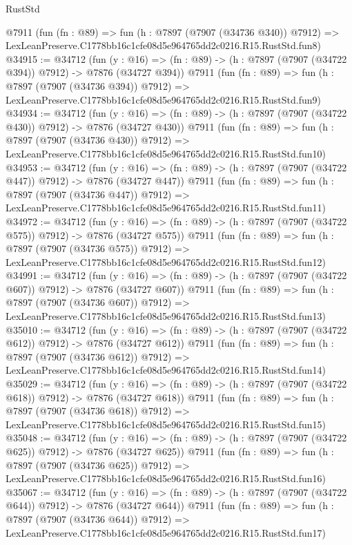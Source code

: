 \begin{lexlean}{RustStd}
\begin{coremodule}
    @7911
    (fun (fn : @89) =>
    fun (h : @7897 (@7907 (@34736 @340)) @7912) =>
    LexLeanPreserve.C1778bb16c1cfe08d5e964765dd2c0216.R15.RustStd.fun8)
@34915 := @34712
    (fun (y : @16) => (fn : @89) -> (h : @7897 (@7907 (@34722 @394)) @7912) -> @7876 (@34727 @394))
    @7911
    (fun (fn : @89) =>
    fun (h : @7897 (@7907 (@34736 @394)) @7912) =>
    LexLeanPreserve.C1778bb16c1cfe08d5e964765dd2c0216.R15.RustStd.fun9)
@34934 := @34712
    (fun (y : @16) => (fn : @89) -> (h : @7897 (@7907 (@34722 @430)) @7912) -> @7876 (@34727 @430))
    @7911
    (fun (fn : @89) =>
    fun (h : @7897 (@7907 (@34736 @430)) @7912) =>
    LexLeanPreserve.C1778bb16c1cfe08d5e964765dd2c0216.R15.RustStd.fun10)
@34953 := @34712
    (fun (y : @16) => (fn : @89) -> (h : @7897 (@7907 (@34722 @447)) @7912) -> @7876 (@34727 @447))
    @7911
    (fun (fn : @89) =>
    fun (h : @7897 (@7907 (@34736 @447)) @7912) =>
    LexLeanPreserve.C1778bb16c1cfe08d5e964765dd2c0216.R15.RustStd.fun11)
@34972 := @34712
    (fun (y : @16) => (fn : @89) -> (h : @7897 (@7907 (@34722 @575)) @7912) -> @7876 (@34727 @575))
    @7911
    (fun (fn : @89) =>
    fun (h : @7897 (@7907 (@34736 @575)) @7912) =>
    LexLeanPreserve.C1778bb16c1cfe08d5e964765dd2c0216.R15.RustStd.fun12)
@34991 := @34712
    (fun (y : @16) => (fn : @89) -> (h : @7897 (@7907 (@34722 @607)) @7912) -> @7876 (@34727 @607))
    @7911
    (fun (fn : @89) =>
    fun (h : @7897 (@7907 (@34736 @607)) @7912) =>
    LexLeanPreserve.C1778bb16c1cfe08d5e964765dd2c0216.R15.RustStd.fun13)
@35010 := @34712
    (fun (y : @16) => (fn : @89) -> (h : @7897 (@7907 (@34722 @612)) @7912) -> @7876 (@34727 @612))
    @7911
    (fun (fn : @89) =>
    fun (h : @7897 (@7907 (@34736 @612)) @7912) =>
    LexLeanPreserve.C1778bb16c1cfe08d5e964765dd2c0216.R15.RustStd.fun14)
@35029 := @34712
    (fun (y : @16) => (fn : @89) -> (h : @7897 (@7907 (@34722 @618)) @7912) -> @7876 (@34727 @618))
    @7911
    (fun (fn : @89) =>
    fun (h : @7897 (@7907 (@34736 @618)) @7912) =>
    LexLeanPreserve.C1778bb16c1cfe08d5e964765dd2c0216.R15.RustStd.fun15)
@35048 := @34712
    (fun (y : @16) => (fn : @89) -> (h : @7897 (@7907 (@34722 @625)) @7912) -> @7876 (@34727 @625))
    @7911
    (fun (fn : @89) =>
    fun (h : @7897 (@7907 (@34736 @625)) @7912) =>
    LexLeanPreserve.C1778bb16c1cfe08d5e964765dd2c0216.R15.RustStd.fun16)
@35067 := @34712
    (fun (y : @16) => (fn : @89) -> (h : @7897 (@7907 (@34722 @644)) @7912) -> @7876 (@34727 @644))
    @7911
    (fun (fn : @89) =>
    fun (h : @7897 (@7907 (@34736 @644)) @7912) =>
    LexLeanPreserve.C1778bb16c1cfe08d5e964765dd2c0216.R15.RustStd.fun17)

\end{coremodule}
\end{lexlean}
